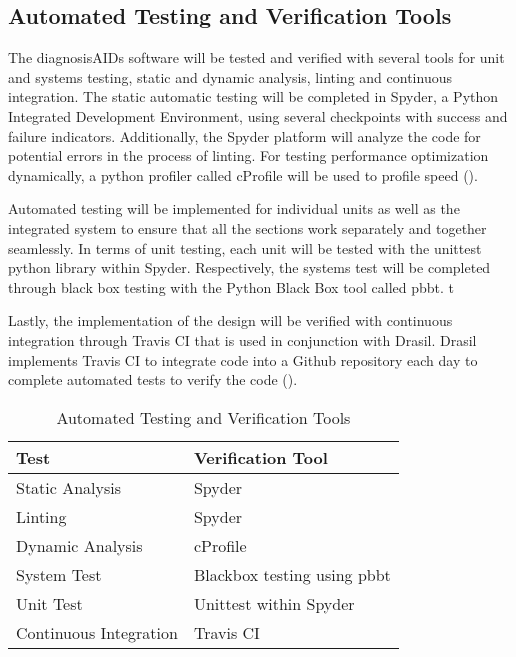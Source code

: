\documentclass[12pt, titlepage]{article}
\begin{document}
\subsection{Automated Testing and Verification Tools}

The diagnosisAIDs software will be tested and verified with several tools for 
unit and systems testing, static and dynamic analysis, linting and continuous 
integration. The static automatic testing will be completed in Spyder, a Python 
Integrated Development Environment, using several checkpoints with success and 
failure indicators. Additionally, the Spyder platform will analyze the code for 
potential errors in the process of linting. For testing performance optimization 
dynamically, a python profiler called cProfile will be used to profile speed (\citet{cProfile}).

Automated testing will be implemented for individual units as well as the 
integrated system to ensure that all the sections work separately and together 
seamlessly. In terms of unit  testing, each unit will be tested with the 
unittest python library within Spyder. Respectively, the systems test will be 
completed through black box testing with the Python Black Box tool called pbbt.
t

Lastly, the implementation of the design will be verified with continuous 
integration through Travis CI that is used in conjunction with Drasil. Drasil 
implements Travis CI to integrate code into a Github repository each day to 
complete automated tests to verify the code (\citet{Drasil}). 

\begin{table}[ht]
\begin{center}
\renewcommand{\arraystretch}{1.2}
\begin{tabular}{l l} 
  \toprule		
  \textbf{Test} & \textbf{Verification Tool}\\
  \midrule 
  Static Analysis & Spyder\\
  Linting & Spyder\\
  Dynamic Analysis & cProfile \\
  System Test & Blackbox testing using pbbt\\
  Unit Test & Unittest within Spyder \\
  Continuous Integration & Travis CI\\
  \bottomrule
\end{tabular}\\
\end{center}
\caption{Automated Testing and Verification Tools}

\end{table}
\end{document}
